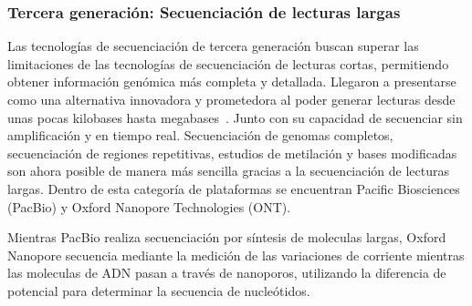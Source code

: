 



\subsubsection{Tercera generación: Secuenciación de lecturas largas}
Las tecnologías de secuenciación de tercera generación buscan superar las limitaciones de las tecnologías de secuenciación de lecturas cortas, permitiendo obtener información genómica más completa y detallada. %
Llegaron a presentarse como una alternativa innovadora y prometedora al poder generar lecturas desde unas pocas kilobases hasta megabases~\cite{amarasinghe2020opportunities}. Junto con su capacidad de secuenciar sin amplificación y en tiempo real. 
Secuenciación de genomas completos, secuenciación de regiones repetitivas, estudios de metilación y bases modificadas son ahora posible de manera más sencilla gracias a la secuenciación de lecturas largas. 
Dentro de esta categoría de plataformas se encuentran Pacific Biosciences (PacBio) y Oxford Nanopore Technologies (ONT).

Mientras PacBio realiza secuenciación por síntesis de moleculas largas, %
Oxford Nanopore secuencia mediante la medición de las variaciones de corriente mientras las moleculas de ADN pasan a través de nanoporos, utilizando la diferencia de potencial para determinar la secuencia de nucleótidos.


